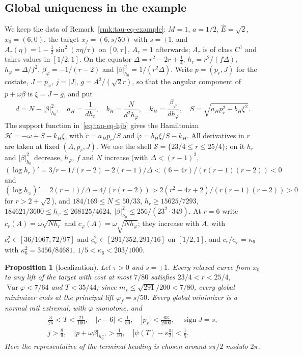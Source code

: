 \documentclass[aip,jmp,amsmath,amssymb,reprint]{revtex4-2}
\newcommand{\Ehat}{\hat E}
\theoremstyle{plain}
\newtheorem{proposition}{Proposition}[section]
\theoremstyle{definition}
\begin{document}
\subsection{Global uniqueness in the example}
We keep the data of Remark~\ref{rmk:tau-eq-example}: $M=1$, $a=1/2$, $\Ehat=\sqrt2$, $x_0=(6,0)$, the
target $x_f=(6,s/50)$ with $s=\pm1$, and $A_\tau(\eta)=1-\frac12\sin^2(\pi\eta/\tau)$ on $[0,\tau]$, $A_\tau=1$
afterwards; $A_\tau$ is of class $C^1$ and takes values in $[1/2,1]$. On the equator
$\Delta=r^2-2r+\frac14$, $h_r=r^2/(f\Delta)$, $h_\varphi=\Delta/f^2$, $\beta_\varphi=-1/(r-2)$ and
$|\beta|^2_{h_0}=1/(r^2\Delta)$. Write $p=(p_r,J)$ for the costate, $J=p_\varphi$, $j=|J|$, $g=A^2/(\sqrt2r)$,
so that the angular component of $p+\omega\beta$ is $\xi=J-g$, and put
\[
  d=N-|\beta|^2_{h_0},\quad a_H=\frac1{dh_r},\quad b_H=\frac N{d^2h_\varphi},\quad k_H=\frac{\beta_\varphi}{dh_\varphi},\quad
  S=\sqrt{a_Hp_r^2+b_H\xi^2}.
\]
The support function in~\eqref{eq:tau-eq-hjb} gives the Hamiltonian
$\mathcal H=-\omega+S-k_H\xi$, with $\dot r=a_Hp_r/S$ and $\dot\varphi=b_H\xi/S-k_H$. All derivatives in $r$ are
taken at fixed $(A,p_r,J)$. We use the shell $\mathcal S=\{23/4\le r\le25/4\}$; on it $h_r$ and $|\beta|^2_{h_0}$
decrease, $h_\varphi$, $f$ and $N$ increase (with $\Delta<(r-1)^2$,
$(\log h_r)'=3/r-1/(r-2)-2(r-1)/\Delta<(6-4r)/(r(r-1)(r-2))<0$ and
$(\log h_\varphi)'=2(r-1)/\Delta-4/(r(r-2))>2(r^2-4r+2)/(r(r-1)(r-2))>0$ for $r>2+\sqrt2$), and $184/169\le N\le50/33$, $h_r\ge15625/7293$,
$184621/3600\le h_\varphi\le268125/4624$, $|\beta|^2_{h_0}\le256/(23^2\cdot349)$. At $r=6$ write
$c_r(A)=\omega\sqrt{Nh_r}$ and $c_\varphi(A)=\omega\sqrt{Nh_\varphi}$; they increase with $A$, with
$c_r^2\in[36/1067,72/97]$ and $c_\varphi^2\in[291/352,291/16]$ on $[1/2,1]$, and $c_r/c_\varphi=\kappa_6$ with
$\kappa_6^2=3456/84681$, $1/5<\kappa_6<203/1000$.

\begin{proposition}[localization]\label{prop:tau-eq-loc}
Let $\tau>0$ and $s=\pm1$. Every relaxed curve from $x_0$ to any lift of the target with cost at most
$7/80$ satisfies $23/4<r<25/4$, $\operatorname{Var}\varphi<7/64$ and $T<35/44$; since $m_s\le\sqrt{291}/200<7/80$,
every global minimizer ends at the principal lift $\varphi_f=s/50$. Every global minimizer is a normal
rail extremal, with $\varphi$ monotone, and
\[
  \begin{array}{l}
  \tfrac{3}{25}<T<\tfrac{21}{100},\quad |r-6|<\tfrac1{50},\quad |p_r|<\tfrac{63}{2000},\quad
  \operatorname{sign}J=s,\\[2pt]
  j>\tfrac89,\quad |p+\omega\beta|_{h_0^{-1}}>\tfrac1{10},\quad |\psi(T)-s\tfrac\pi2|<\tfrac15 .
  \end{array}
\]
Here the representative of the terminal heading is chosen around $s\pi/2$ modulo $2\pi$.
\end{proposition}
\end{document}
